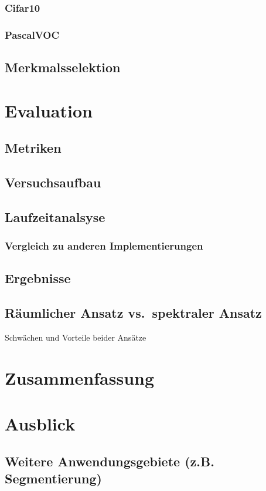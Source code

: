 \subsection{Cifar10}
\subsection{PascalVOC}
\section{Merkmalsselektion}

\chapter{Evaluation}
\section{Metriken}
\section{Versuchsaufbau}
\section{Laufzeitanalsyse}
  \subsection{Vergleich zu anderen Implementierungen}
\section{Ergebnisse}
\section{Räumlicher Ansatz vs.\ spektraler Ansatz}
Schwächen und Vorteile beider Ansätze

\chapter{Zusammenfassung}

\chapter{Ausblick}
\section{Weitere Anwendungsgebiete (z.B. Segmentierung)}
